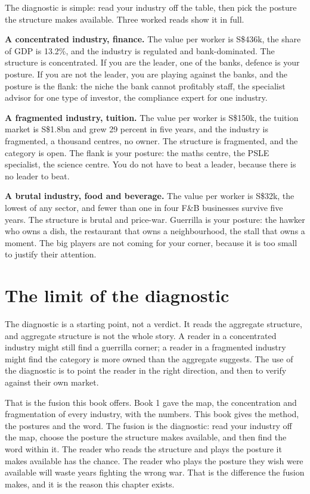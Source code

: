 \documentclass[10pt,twoside,openany]{memoir}
\newcommand{\needspacehead}{\needspace{4\baselineskip}}
\let\oldsection\section
\renewcommand{\section}{\needspacehead\oldsection}
\begin{document}
{{The diagnostic is simple: read your industry off the table, then pick
the posture the structure makes available. Three worked reads show it in
full.

\textbf{A concentrated industry, finance.} The value per worker is
S\$436k, the share of GDP is 13.2\%, and the industry is regulated and
bank-dominated. The structure is concentrated. If you are the leader,
one of the banks, defence is your posture. If you are not the leader,
you are playing against the banks, and the posture is the flank: the
niche the bank cannot profitably staff, the specialist advisor for one
type of investor, the compliance expert for one industry.

\textbf{A fragmented industry, tuition.} The value per worker is
S\$150k, the tuition market is S\$1.8bn and grew 29 percent in five
years, and the industry is fragmented, a thousand centres, no owner. The
structure is fragmented, and the category is open. The flank is your
posture: the maths centre, the PSLE specialist, the science centre. You
do not have to beat a leader, because there is no leader to beat.

\textbf{A brutal industry, food and beverage.} The value per worker is
S\$32k, the lowest of any sector, and fewer than one in four F\&B
businesses survive five years. The structure is brutal and price-war.
Guerrilla is your posture: the hawker who owns a dish, the restaurant
that owns a neighbourhood, the stall that owns a moment. The big players
are not coming for your corner, because it is too small to justify their
attention.

\section{The limit of the diagnostic}\label{the-limit-of-the-diagnostic}

The diagnostic is a starting point, not a verdict. It reads the
aggregate structure, and aggregate structure is not the whole story. A
reader in a concentrated industry might still find a guerrilla corner; a
reader in a fragmented industry might find the category is more owned
than the aggregate suggests. The use of the diagnostic is to point the
reader in the right direction, and then to verify against their own
market.

That is the fusion this book offers. Book 1 gave the map, the
concentration and fragmentation of every industry, with the numbers.
This book gives the method, the postures and the word. The fusion is the
diagnostic: read your industry off the map, choose the posture the
structure makes available, and then find the word within it. The reader
who reads the structure and plays the posture it makes available has the
chance. The reader who plays the posture they wish were available will
waste years fighting the wrong war. That is the difference the fusion
makes, and it is the reason this chapter exists.

}}
\end{document}
